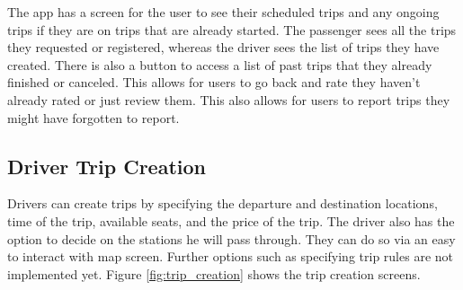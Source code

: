 \documentclass[a4paper, 12pt]{report} %
\begin{document}
            The app has a screen for the user to see their scheduled trips and any ongoing trips if they are on trips that are already started. The passenger sees all the trips they requested or registered, whereas the driver sees the list of trips they have created. There is also a button to access a list of past trips that they already finished or canceled. This allows for users to go back and rate they haven't already rated or just review them. This also allows for users to report trips they might have forgotten to report. 

        \subsection{Driver Trip Creation}
            Drivers can create trips by specifying the departure and destination locations, time of the trip, available seats, and the price of the trip. The driver also has the option to decide on the stations he will pass through. They can do so via an easy to interact with map screen. Further options such as specifying trip rules are not implemented yet. Figure \ref{fig:trip_creation} shows the trip creation screens.
\end{document}
